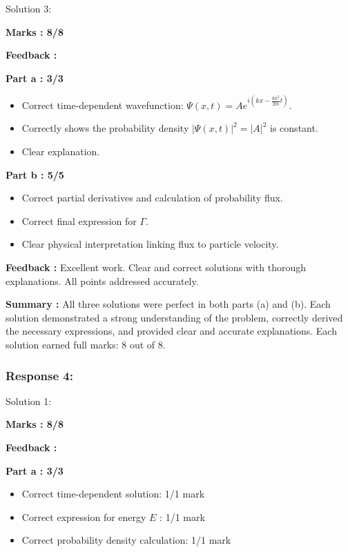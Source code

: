 \documentclass[a4paper,11pt]{article}
\begin{document}
Solution 3:

\textbf{Marks : 8/8}

\textbf{Feedback : }

\textbf{Part a : 3/3}

\begin{itemize}
    \item Correct time-dependent wavefunction: $\Psi(x,t) = Ae^{i(kx-\frac{\hbar k^2}{2m}t)}$.
    \item Correctly shows the probability density $|\Psi(x,t)|^2 = |A|^2$ is constant.
    \item Clear explanation.
\end{itemize}


\textbf{Part b : 5/5}

\begin{itemize}
    \item Correct partial derivatives and calculation of probability flux.
    \item Correct final expression for $\Gamma$.
    \item Clear physical interpretation linking flux to particle velocity.
\end{itemize}


\textbf{Feedback :}
Excellent work. Clear and correct solutions with thorough explanations. All points addressed accurately.

\textbf{Summary :}
All three solutions were perfect in both parts (a) and (b). Each solution demonstrated a strong understanding of the problem, correctly derived the necessary expressions, and provided clear and accurate explanations. Each solution earned full marks: 8 out of 8.


\subsubsection*{Response 4:}

Solution 1:

\textbf{Marks : 8/8}

\textbf{Feedback : }

\textbf{Part a : 3/3}

\begin{itemize}
    \item Correct time-dependent solution: 1/1 mark
    \item Correct expression for energy $E$ : 1/1 mark
    \item Correct probability density calculation: 1/1 mark
\end{itemize}
\end{document}

